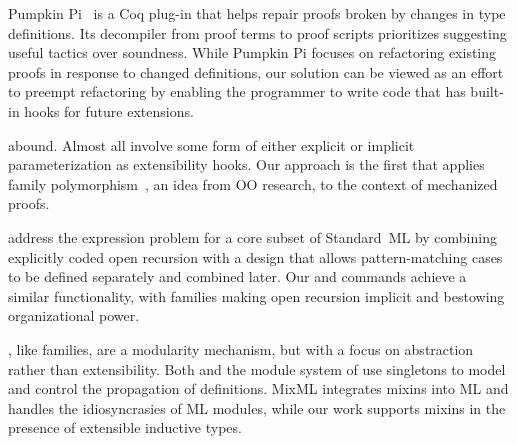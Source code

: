 Pumpkin Pi~\cite{ringer2021pumpkin} is a Coq plug-in that helps
repair proofs broken by changes in type definitions.
Its decompiler from proof terms to proof scripts prioritizes suggesting
useful tactics over soundness.
While Pumpkin Pi focuses on refactoring existing proofs in response to
changed definitions,
our solution can be viewed as an effort to preempt refactoring by
enabling the programmer to write code that has built-in hooks for
future extensions.

 \!abound.
Almost all involve some form of either explicit or implicit parameterization
as extensibility hooks.
Our approach is the first that applies family polymorphism~\cite{ernst2001family},
an idea from OO research,
to the context of mechanized proofs.

\citet{bac2006} address the expression problem for a core subset of Standard~ML
by combining explicitly coded open recursion with a design that
allows pattern-matching cases to be defined separately and combined
later.
Our  and  commands achieve a similar
functionality, with families making open recursion implicit and
bestowing organizational power.

\!\!, like families, are a modularity mechanism,
but with a focus on abstraction rather than extensibility.
Both \TT and the module system of \citet{stohar2000} use singletons to model and
control the propagation of definitions.
\mbox{MixML} \cite{rosdre2013} integrates mixins into ML and handles the
idiosyncrasies of ML modules,
while our work supports mixins in the presence of extensible inductive types.



